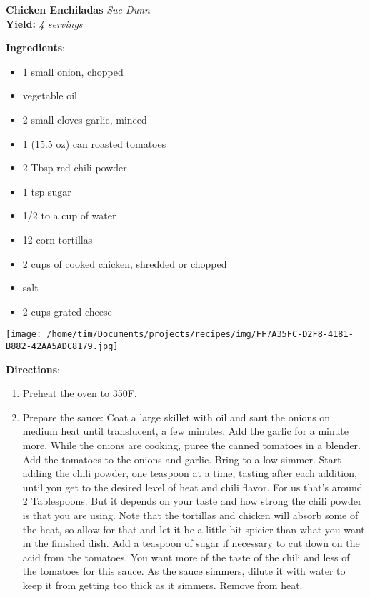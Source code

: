 \documentclass[11pt, twoside, openany]{book}
\begin{document}
\noindent\begin{minipage}[t]{\linewidth}%
{\Large\textbf{Chicken Enchiladas}} \label{chicken-enchiladas}\hfill\textit{Sue Dunn}\\
\textbf{Yield:} \textit{4 servings}\\
\noindent\begin{minipage}[t]{0.78\linewidth}%
\textbf{Ingredients}:\vspace{-3mm}
\begin{multicols}{2}
\begin{itemize}\setlength\itemsep{-1mm}
\item 1 small onion, chopped
\item vegetable oil
\item 2 small cloves garlic, minced
\item 1 (15.5 oz) can roasted tomatoes
\item 2 Tbsp red chili powder
\item 1 tsp sugar
\item 1/2 to a cup of water
\item 12 corn tortillas
\item 2 cups of cooked chicken, shredded or chopped
\item salt
\item 2 cups grated cheese
\end{itemize}
\end{multicols}
\end{minipage}
\noindent\begin{minipage}[t]{0.18\linewidth}
\centering \strut\vspace*{-\baselineskip}\newline
\texttt{[image: /home/tim/Documents/projects/recipes/img/FF7A35FC-D2F8-4181-B882-42AA5ADC8179.jpg]}\\
\end{minipage}\vspace{3mm}
\textbf{Directions}:
\vspace{-3mm}\begin{enumerate}\setlength\itemsep{-1mm}
\item Preheat the oven to 350F.
\item Prepare the sauce: Coat a large skillet with oil and saut the onions on medium heat until translucent, a few minutes. Add the garlic for a minute more. While the onions are cooking, puree the canned tomatoes in a blender. Add the tomatoes to the onions and garlic. Bring to a low simmer. Start adding the chili powder, one teaspoon at a time, tasting after each addition, until you get to the desired level of heat and chili flavor. For us that's around 2 Tablespoons. But it depends on your taste and how strong the chili powder is that you are using. Note that the tortillas and chicken will absorb some of the heat, so allow for that and let it be a little bit spicier than what you want in the finished dish. Add a teaspoon of sugar if necessary to cut down on the acid from the tomatoes. You want more of the taste of the chili and less of the tomatoes for this sauce. As the sauce simmers, dilute it with water to keep it from getting too thick as it simmers. Remove from heat.

\end{enumerate}
\end{minipage}
\end{document}
